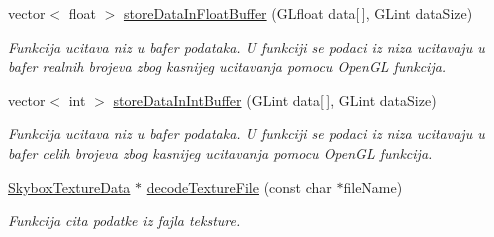\begin{DoxyCompactItemize}
vector$<$ float $>$ \hyperlink{classcore_1_1VaoLoader_a016f118749e83bbf79e6d0f2c9bf9209}{store\+Data\+In\+Float\+Buffer} (G\+Lfloat data\mbox{[}$\,$\mbox{]}, G\+Lint data\+Size)
\begin{DoxyCompactList}\small\item\em Funkcija ucitava niz u bafer podataka. U funkciji se podaci iz niza ucitavaju u bafer realnih brojeva zbog kasnijeg ucitavanja pomocu Open\+GL funkcija. \end{DoxyCompactList}\item 
vector$<$ int $>$ \hyperlink{classcore_1_1VaoLoader_ab2c24b482be973465c548b03bf5df3af}{store\+Data\+In\+Int\+Buffer} (G\+Lint data\mbox{[}$\,$\mbox{]}, G\+Lint data\+Size)
\begin{DoxyCompactList}\small\item\em Funkcija ucitava niz u bafer podataka. U funkciji se podaci iz niza ucitavaju u bafer celih brojeva zbog kasnijeg ucitavanja pomocu Open\+GL funkcija. \end{DoxyCompactList}\item 
\hyperlink{classtexture_1_1SkyboxTextureData}{Skybox\+Texture\+Data} $\ast$ \hyperlink{classcore_1_1VaoLoader_a8310742834449c159828f87e771a5258}{decode\+Texture\+File} (const char $\ast$file\+Name)
\begin{DoxyCompactList}\small\item\em Funkcija cita podatke iz fajla teksture. \end{DoxyCompactList}\end{DoxyCompactItemize}
